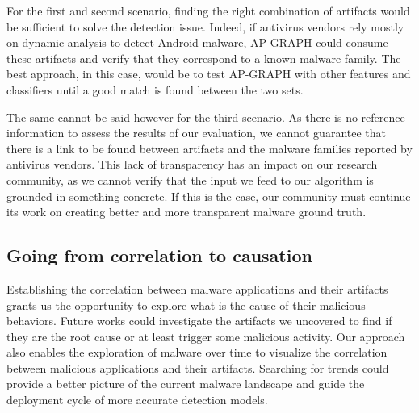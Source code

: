For the first and second scenario, finding the right combination of artifacts would be sufficient to solve the detection issue.
Indeed, if antivirus vendors rely mostly on dynamic analysis to detect Android malware, AP-GRAPH could consume these artifacts and verify that they correspond to a known malware family.
The best approach, in this case, would be to test AP-GRAPH with other features and classifiers until a good match is found between the two sets.

The same cannot be said however for the third scenario.
As there is no reference information to assess the results of our evaluation, we cannot guarantee that there is a link to be found between artifacts and the malware families reported by antivirus vendors.
This lack of transparency has an impact on our research community, as we cannot verify that the input we feed to our algorithm is grounded in something concrete.
If this is the case, our community must continue its work on creating better and more transparent malware ground truth.
\subsection{Going from correlation to causation}
Establishing the correlation between malware applications and their artifacts grants us the opportunity to explore what is the cause of their malicious behaviors.
Future works could investigate the artifacts we uncovered to find if they are the root cause or at least trigger some malicious activity.
Our approach also enables the exploration of malware over time to visualize the correlation between malicious applications and their artifacts.
Searching for trends could provide a better picture of the current malware landscape and guide the deployment cycle of more accurate detection models.
